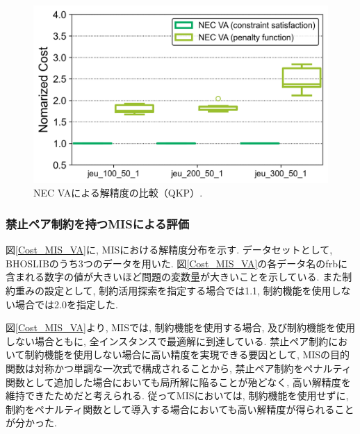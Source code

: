 \documentclass[submit,techrep,noauthor]{ipsj}
\begin{document}
\begin{figure}[tb]
\centering
\includegraphics[bb=0 0 700 230, width=15cm]{Cost_QKP_VA.png}
\caption{NEC VAによる解精度の比較（QKP）.}
\label{Cost_QKP_VA}
\end{figure}

\subsubsection{禁止ペア制約を持つMISによる評価}
図\ref{Cost_MIS_VA}に, MISにおける解精度分布を示す. データセットとして, BHOSLIB\cite{mislib}のうち3つのデータを用いた. 図\ref{Cost_MIS_VA}の各データ名のfrbに含まれる数字の値が大きいほど問題の変数量が大きいことを示している. また制約重みの設定として, 制約活用探索を指定する場合では1.1, 制約機能を使用しない場合では2.0を指定した.

図\ref{Cost_MIS_VA}より, MISでは, 制約機能を使用する場合, 及び制約機能を使用しない場合ともに, 全インスタンスで最適解に到達している. 禁止ペア制約において制約機能を使用しない場合に高い精度を実現できる要因として, MISの目的関数は対称かつ単調な一次式で構成されることから, 禁止ペア制約をペナルティ関数として追加した場合においても局所解に陥ることが殆どなく, 高い解精度を維持できたためだと考えられる. 従ってMISにおいては, 制約機能を使用せずに, 制約をペナルティ関数として導入する場合においても高い解精度が得られることが分かった.

\end{document}
